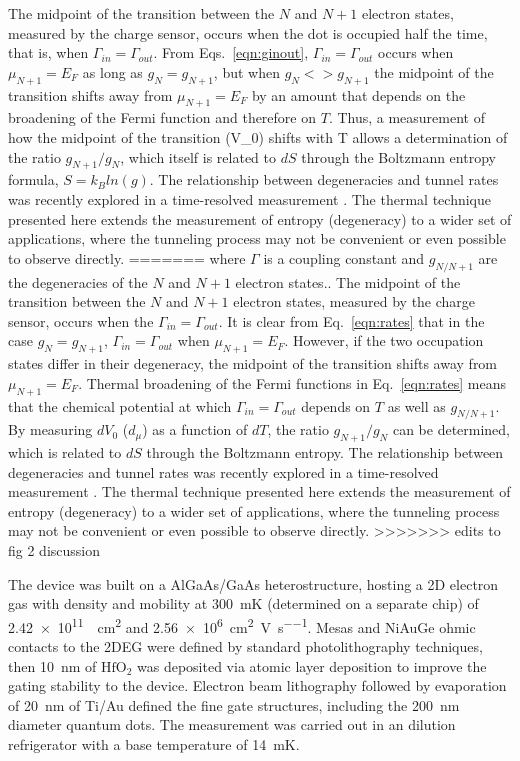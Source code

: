 \documentclass[twocolumn,showpacs,preprintnumbers,amsmath,amssymb,pra,aps,superscriptaddress]{revtex4-1}
\begin{document}
The midpoint of the transition between the $N$ and $N+1$ electron states, measured by the charge sensor, occurs when the dot is occupied half the time, that is, when $\Gamma_{in} = \Gamma_{out}$. From Eqs.~\ref{eqn:ginout}, $\Gamma_{in} = \Gamma_{out}$ occurs when $\mu_{N+1} = E_F$ as long as $g_{N}=g_{N+1}$, but when $g_{N}<>g_{N+1}$ the midpoint of the transition shifts away from $\mu_{N+1}=E_F$ by an amount that depends on the broadening of the Fermi function and therefore on $T$.   Thus, a measurement of how the midpoint of the transition (V_0) shifts with T allows a determination of the ratio $g_{N+1}/g_{N}$, which itself is related to $dS$ through the Boltzmann entropy formula, $S=k_B ln(g)$.  The relationship between degeneracies and tunnel rates was recently explored in a time-resolved measurement \cite{Hofmann2016}.  The thermal technique presented here extends the measurement of entropy (degeneracy) to a wider set of applications, where the tunneling process may not be convenient or even possible to observe directly.
=======
where $\Gamma$ is a coupling constant and $g_{N/N+1}$ are the degeneracies of the $N$ and $N+1$ electron states.. The midpoint of the transition between the $N$ and $N+1$ electron states, measured by the charge sensor, occurs when the $\Gamma_{in} = \Gamma_{out}$. It is clear from Eq.~\ref{eqn:rates} that in the case $g_{N}=g_{N+1}$, $\Gamma_{in} = \Gamma_{out}$ when $\mu_{N+1} = E_F$. However, if the two occupation states differ in their degeneracy, the midpoint of the transition shifts away from $\mu_{N+1}=E_F$. Thermal broadening of the Fermi functions in Eq.~\ref{eqn:rates} means that the chemical potential at which $\Gamma_{in} = \Gamma_{out}$ depends on $T$ as well as $g_{N/N+1}$. By measuring $dV_0$ ($d_\mu$) as a function of $dT$, the ratio $g_{N+1}/g_{N}$ can be determined, which is related to $dS$ through the Boltzmann entropy. The relationship between degeneracies and tunnel rates was recently explored in a time-resolved measurement \cite{Hofmann2016}.  The thermal technique presented here extends the measurement of entropy (degeneracy) to a wider set of applications, where the tunneling process may not be convenient or even possible to observe directly.
>>>>>>> edits to fig 2 discussion

The device was built on a AlGaAs/GaAs heterostructure, hosting a 2D electron gas with density and mobility at \SI{300}{\milli\kelvin} (determined on a separate chip) of \SI{2.42e11}{\per\square\centi\metre} and \SI[per-mode=symbol]{2.56e6}{\square\centi\metre\per\volt\per\second}.   Mesas and NiAuGe ohmic contacts to the 2DEG were defined by standard photolithography techniques, then \SI{10}{\nano\metre} of $\mathrm{HfO_2}$ was deposited via atomic layer deposition to improve the gating stability to the device. Electron beam lithography followed by evaporation of \SI{20}{\nano\metre} of Ti/Au defined the fine gate structures, including the \SI{200}{\nano\metre} diameter quantum dots. The measurement was carried out in an dilution refrigerator with a base temperature of \SI{14}{\milli\kelvin}.
\end{document}
